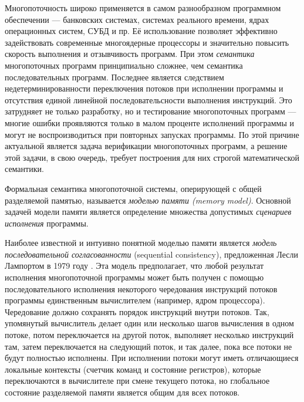 
{\actuality} 
Многопоточность широко применяется в самом разнообразном программном обеспечении ---
банковских системах, системах реального времени, ядрах операционных систем, СУБД и пр.
Её использование позволяет эффективно задействовать современные многоядерные процессоры и
значительно повысить скорость выполнения и отзывчивость программ.
При этом \emph{семантика} многопоточных программ принципиально сложнее,
чем семантика последовательных программ.
Последнее является следствием недетерминированности переключения потоков при исполнении
программы и отсутствия единой линейной последовательсности выполнения инструкций.
Это затрудняет не только разработку, но и тестирование многопоточных программ  --- 
многие ошибки проявляются только в малом проценте исполнений программы и 
могут не воспроизводиться при повторных запусках программы.
По этой причине актуальной является задача верификации многопоточных программ, а
решение этой задачи, в свою очередь, требует построения  для них 
строгой математической  семантики.

Формальная семантика многопоточной системы, оперирующей с общей разделяемой памятью,
называется \emph{моделью памяти (memory model)}. 
Основной задачей модели памяти является определение множества 
допустимых \emph{сценариев исполнения} программы.

Наиболее известной и интуивно понятной моделью памяти является 
\emph{модель последовательной согласованности} (sequential consistency),
предложенная Лесли Лампортом в 1979 году \cite{Lamport:TC79}.
Эта модель предполагает, что любой результат исполнения многопоточной программы может быть
получен с помощью последовательного исполнения некоторого чередования инструкций потоков программы
единственным вычислителем (например, ядром процессора).
Чередование должно сохранять порядок инструкций внутри потоков.
Так, упомянутый вычислитель делает один или несколько шагов вычисления в одном потоке, потом переключается на другой поток,
выполняет несколько инструкций там, затем переключается на следующий поток, и так далее, пока
все потоки не будут полностью исполнены. 
При исполнении потоки могут иметь отличающиеся локальные контексты 
(счетчик команд и состояние регистров),
которые переключаются в вычислителе при смене текущего потока, 
но глобальное состояние разделяемой памяти является общим для всех потоков.

